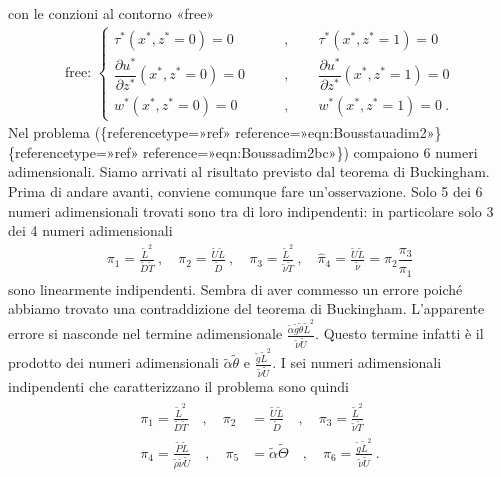\documentclass[letterpaper,10pt,italian]{jupyterBook}
\begin{document}
\sphinxAtStartPar
con le conzioni al contorno «free»
\begin{equation*}
\begin{split}\label{eqn:Bouss-adim-2-bc}
    \text{free: }
    \left\{
    \begin{aligned}
      \tau^*(x^*,z^*=0) = 0 \qquad  & , \qquad 
      \tau^*(x^*,z^*=1) = 0 \\
      \dfrac{\partial u^*}{\partial z^*}(x^*,z^*=0) = 0 \qquad & , \qquad 
      \dfrac{\partial u^*}{\partial z^*}(x^*,z^*=1) = 0 \\
      w^*(x^*,z^*=0) = 0 \qquad & , \qquad w^*(x^*,z^*=1) = 0 \ .
    \end{aligned} \right.\end{split}
\end{equation*}
\sphinxAtStartPar
Nel problema
(\{reference\sphinxhyphen{}type=»ref»
reference=»eqn:Bouss\sphinxhyphen{}tau\sphinxhyphen{}adim\sphinxhyphen{}2»\}\sphinxhyphen{}\{reference\sphinxhyphen{}type=»ref»
reference=»eqn:Bouss\sphinxhyphen{}adim\sphinxhyphen{}2\sphinxhyphen{}bc»\}) compaiono 6 numeri adimensionali.
Siamo arrivati al risultato previsto dal teorema di Buckingham. Prima di
andare avanti, conviene comunque fare un’osservazione. Solo 5 dei 6
numeri adimensionali trovati sono tra di loro indipendenti: in
particolare solo 3 dei 4 numeri adimensionali
\begin{equation*}
\begin{split}\pi_1 = \frac{\tilde{L}^2}{\tilde{D}\tilde{T}} \ , \quad
    \pi_2 = \frac{\tilde{U}\tilde{L}}{\tilde{D}} \ , \quad
    \pi_3 = \frac{\tilde{L}^2}{\tilde{\nu}\tilde{T}} \ , \quad 
    \hat{\pi}_4 = \frac{\tilde{U}\tilde{L}}{\tilde{\nu}} = \pi_2 \dfrac{\pi_3}{\pi_1}\end{split}
\end{equation*}
\sphinxAtStartPar
sono linearmente indipendenti. Sembra di aver commesso un errore poiché
abbiamo trovato una contraddizione del teorema di Buckingham.
L’apparente errore si nasconde nel termine adimensionale
\(\frac{\tilde{\alpha} \tilde{g} \tilde{\theta} \tilde{L}^2}{\tilde{\nu} \tilde{U}}\).
Questo termine infatti è il prodotto dei numeri adimensionali
\(\tilde{\alpha} \tilde{\theta}\) e
\(\frac{\tilde{g} \tilde{L}^2}{\tilde{\nu} \tilde{U}}\). I sei numeri
adimensionali indipendenti che caratterizzano il problema sono quindi
\begin{equation*}
\begin{split}\begin{aligned}
    \pi_1 = \frac{\tilde{L}^2}{\tilde{D}\tilde{T}} \quad ,\quad
    \pi_2 & = \frac{\tilde{U}\tilde{L}}{\tilde{D}} \quad ,\quad
    \pi_3 = \frac{\tilde{L}^2}{\tilde{\nu}\tilde{T}} \\
    \pi_4 = \frac{\tilde{P}\tilde{L}}{\tilde{\rho}\tilde{\nu}\tilde{U}} \quad ,\quad
    \pi_5 & = {\tilde{\alpha}\tilde{\Theta}} \quad ,\quad
    \pi_6 = \frac{\tilde{g} \tilde{L}^2}{\tilde{\nu} \tilde{U}} \ .
\end{aligned}\end{split}
\end{equation*}
\end{document}

